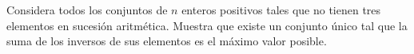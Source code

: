 Considera todos los conjuntos de $n$ enteros positivos tales que no tienen tres elementos en sucesión aritmética. Muestra que existe un conjunto único tal que la suma de los inversos de sus elementos es el máximo valor posible.